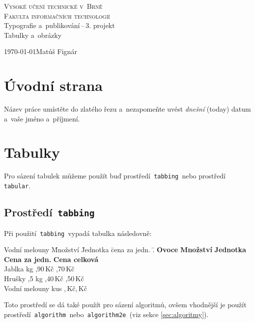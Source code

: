 \documentclass[11pt, a4paper]{article}
\begin{document}
\begin{titlepage}
    \begin{center}
        \textsc{\Huge{Vysoké učení technické v~Brně\\[0.4em]}
        \huge{Fakulta informačních technologií}}\\        
        \LARGE{Typografie a~publikování\,--\,3. projekt}\\
        \Huge{Tabulky a~obrázky}\\
    \end{center}
    \Large{\today\hfill Matúš Fignár}
\end{titlepage}

\section{Úvodní strana}
Název práce umístěte do zlatého řezu a~nezapomeňte uvést \emph{dnešní} (today) datum a~vaše jméno a~příjmení.

\section{Tabulky}
Pro sázení tabulek můžeme použít buď prostředí\texttt{ tabbing }nebo prostředí\texttt{ tabular}.

\subsection{Prostředí\texttt{ tabbing}}
Při použití\texttt{ tabbing }vypadá tabulka následovně:
\begin{tabbing}
    Vodní melouny \quad \= Množství \hspace{3pt} \= Jednotka \quad \= cena za jedn. \quad\:\=  .\kill
    \textbf{Ovoce} \> \textbf{Množství} \> \textbf{Jednotka} \> \textbf{Cena za jedn.} \> \textbf{Cena celková} \\
    Jablka  \> kg ,90\,Kč ,70\,Kč \\
    Hrušky ,5 \> kg ,40\,Kč ,50\,Kč \\
    Vodní melouny  \> kus ,\textendash\,Kč,\textendash\,Kč \\
\end{tabbing}

\noindent Toto prostředí se dá také použít pro sázení algoritmů, ovšem vhodnější je použít prostředí\texttt{ algorithm }nebo\texttt{ algorithm2e }(viz sekce \ref{sec:algoritmy}).
\end{document}
